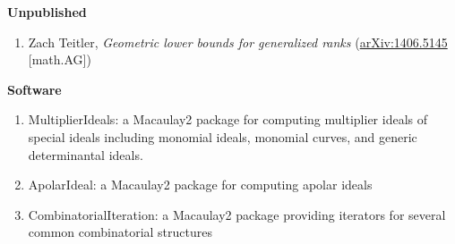 \documentclass[12pt]{article}
\begin{document}
\textbf{Unpublished}
\begin{enumerate}[revarabic,labelwidth=*]
\item Zach Teitler,
\emph{Geometric lower bounds for generalized ranks} %
(\href{http://arxiv.org/abs/1406.5145}{arXiv:1406.5145} [math.AG])
\end{enumerate}



\textbf{Software}
\begin{enumerate}[revarabic,labelwidth=*]

\item MultiplierIdeals:
a Macaulay2 package for computing multiplier ideals of special ideals including monomial ideals, monomial curves, and generic determinantal ideals.

\item ApolarIdeal:
a Macaulay2 package for computing apolar ideals

\item CombinatorialIteration:
a Macaulay2 package providing iterators for several common combinatorial structures

\end{enumerate}


%
%




\end{document}
